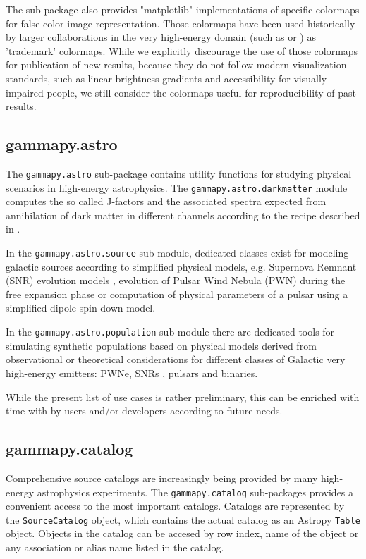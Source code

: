 \documentclass[traditabstract, longauth]{aa}
\newcommand{\code}[1]{\texttt{#1}}
\begin{document}
The sub-package also provides "matplotlib" implementations of specific
colormaps for false color image representation. Those colormaps have
been used historically by larger collaborations in the very high-energy
domain (such as \milagro or \hess) as 'trademark' colormaps.
While we explicitly discourage the use of those colormaps for publication
of new results, because they do not follow modern visualization
standards, such as linear brightness gradients and accessibility
for visually impaired people, we still consider the colormaps
useful for reproducibility of past results.

\subsection{gammapy.astro}
\label{ssec:gammapy-astro}
The \code{gammapy.astro} sub-package contains utility functions for studying physical
scenarios in high-energy astrophysics. The \code{gammapy.astro.darkmatter} module
computes the so called J-factors and the associated \gammaray spectra expected
from annihilation of dark matter in different channels according to the recipe
described in \cite{2011JCAP...03..051C}.

In the \code{gammapy.astro.source} sub-module, dedicated classes exist for modeling
galactic \gammaray sources according to simplified physical models, e.g. Supernova Remnant (SNR) evolution
models \citep{1950RSPSA.201..159T, 1999ApJS..120..299T}, evolution of Pulsar Wind Nebula (PWN) during the
free expansion phase \citep{2006ARA&A..44...17G} or computation
of physical parameters of a pulsar using a simplified dipole spin-down model.

In the \code{gammapy.astro.population} sub-module there are dedicated tools
for simulating synthetic populations based on physical models derived from
observational or theoretical considerations for different classes of Galactic
very high-energy \gammaray emitters: PWNe, SNRs \cite{1998ApJ...504..761C},
pulsars \cite{2006ApJ...643..332F, 2006MNRAS.372..777L, 2004A&A...422..545Y}
and \gammaray binaries.

While the present list of use cases is rather preliminary, this can be enriched
with time with by users and/or developers according to future needs.

\subsection{gammapy.catalog}
\label{ssec:gammapy-catalog}
Comprehensive source catalogs are increasingly being provided by many high-energy
 astrophysics experiments. The \code{gammapy.catalog} sub-packages
provides a convenient access to the most important \gammaray catalogs.
Catalogs are represented by the \code{SourceCatalog} object, which
contains the actual catalog as an Astropy \code{Table} object.
Objects in the catalog can be accesed by row index, name of the
object or any association or alias name listed in the catalog.
\end{document}
